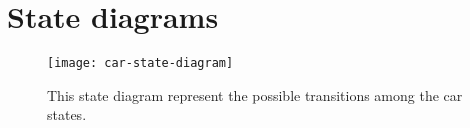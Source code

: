 \section{State diagrams}

\begin{figure}[H]
	\centering
	\texttt{[image: car-state-diagram]}
	\caption[Car state diagram]{This state diagram represent the possible transitions among the car states.}
	\label{fig:car-state-diagram}
\end{figure}